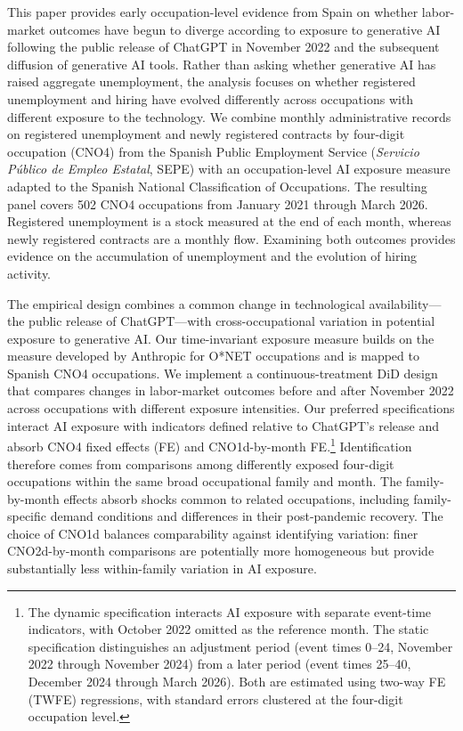 \documentclass[11pt]{article}
\begin{document}
This paper provides early occupation-level evidence from Spain on whether labor-market outcomes have begun to diverge according to exposure to generative AI following the public release of ChatGPT in November 2022 and the subsequent diffusion of generative AI tools. Rather than asking whether generative AI has raised aggregate unemployment, the analysis focuses on whether registered unemployment and hiring have evolved differently across occupations with different exposure to the technology. We combine monthly administrative records on registered unemployment and newly registered contracts by four-digit occupation (CNO4) from the Spanish Public Employment Service (\textit{Servicio P\'ublico de Empleo Estatal}, SEPE) with an occupation-level AI exposure measure adapted to the Spanish National Classification of Occupations. The resulting panel covers 502 CNO4 occupations from January 2021 through March 2026. Registered unemployment is a stock measured at the end of each month, whereas newly registered contracts are a monthly flow. Examining both outcomes provides evidence on the accumulation of unemployment and the evolution of hiring activity.

The empirical design combines a common change in technological availability---the public release of ChatGPT---with cross-occupational variation in potential exposure to generative AI. Our time-invariant exposure measure builds on the measure developed by Anthropic for O*NET occupations \citep{massenkoff_mccrory_2026} and is mapped to Spanish CNO4 occupations. We implement a continuous-treatment DiD design that compares changes in labor-market outcomes before and after November 2022 across occupations with different exposure intensities. Our preferred specifications interact AI exposure with indicators defined relative to ChatGPT's release and absorb CNO4 fixed effects (FE) and CNO1d-by-month FE.\footnote{The dynamic specification interacts AI exposure with separate event-time indicators, with October 2022 omitted as the reference month. The static specification distinguishes an adjustment period (event times 0--24, November 2022 through November 2024) from a later period (event times 25--40, December 2024 through March 2026). Both are estimated using two-way FE (TWFE) regressions, with standard errors clustered at the four-digit occupation level.} Identification therefore comes from comparisons among differently exposed four-digit occupations within the same broad occupational family and month. The family-by-month effects absorb shocks common to related occupations, including family-specific demand conditions and differences in their post-pandemic recovery. The choice of CNO1d balances comparability against identifying variation: finer CNO2d-by-month comparisons are potentially more homogeneous but provide substantially less within-family variation in AI exposure.
\end{document}
